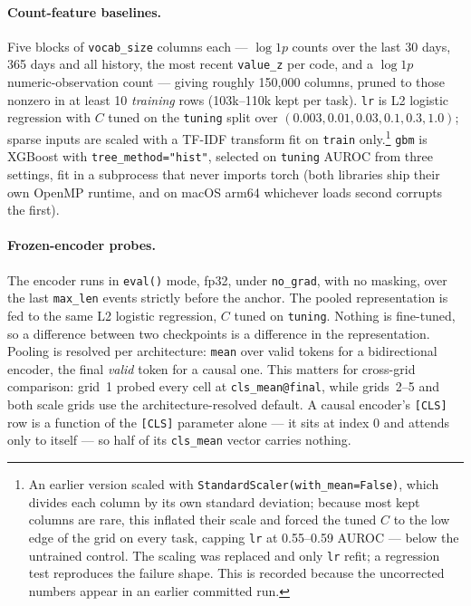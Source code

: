 \documentclass[11pt,a4paper]{article}
\newcommand{\code}[1]{\texttt{\small #1}}
\begin{document}
\paragraph{Count-feature baselines.}
Five blocks of \code{vocab\_size} columns each --- $\log 1p$ counts over the
last 30 days, 365 days and all history, the most recent \code{value\_z} per
code, and a $\log 1p$ numeric-observation count --- giving roughly 150{,}000
columns, pruned to those nonzero in at least 10 \emph{training} rows
(103k--110k kept per task). \code{lr} is L2 logistic regression with $C$ tuned
on the \code{tuning} split over $(0.003, 0.01, 0.03, 0.1, 0.3, 1.0)$; sparse
inputs are scaled with a TF-IDF transform fit on \code{train} only.\footnote{An
earlier version scaled with \code{StandardScaler(with\_mean=False)}, which
divides each column by its own standard deviation; because most kept columns
are rare, this inflated their scale and forced the tuned $C$ to the low edge of
the grid on every task, capping \code{lr} at 0.55--0.59 AUROC --- below the
untrained control. The scaling was replaced and only \code{lr} refit; a
regression test reproduces the failure shape. This is recorded because the
uncorrected numbers appear in an earlier committed run.} \code{gbm} is XGBoost
with \code{tree\_method="hist"}, selected on \code{tuning} AUROC from three
settings, fit in a subprocess that never imports torch (both libraries ship
their own OpenMP runtime, and on macOS arm64 whichever loads second corrupts
the first).

\paragraph{Frozen-encoder probes.}
The encoder runs in \code{eval()} mode, fp32, under \code{no\_grad}, with no
masking, over the last \code{max\_len} events strictly before the anchor. The
pooled representation is fed to the same L2 logistic regression, $C$ tuned on
\code{tuning}. Nothing is fine-tuned, so a difference between two checkpoints is
a difference in the representation. Pooling is resolved per architecture:
\code{mean} over valid tokens for a bidirectional encoder, the final \emph{valid}
token for a causal one. This matters for cross-grid comparison: grid~1 probed
every cell at \code{cls\_mean@final}, while grids~2--5 and both scale grids use
the architecture-resolved default. A causal encoder's \code{[CLS]} row is a
function of the \code{[CLS]} parameter alone --- it sits at index 0 and attends
only to itself --- so half of its \code{cls\_mean} vector carries nothing.
\end{document}
